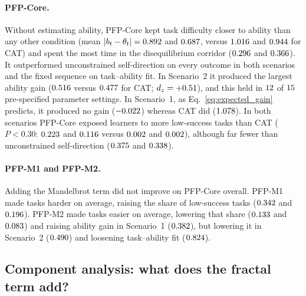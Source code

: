 \paragraph{PFP-Core.} Without estimating ability, PFP-Core kept task difficulty closer to ability than any other condition (mean $|b_t - \theta_t| = 0.892$ and $0.687$, versus $1.016$ and $0.944$ for CAT) and spent the most time in the disequilibrium corridor ($0.296$ and $0.366$). It outperformed unconstrained self-direction on every outcome in both scenarios and the fixed sequence on task--ability fit. In Scenario~2 it produced the largest ability gain ($0.516$ versus $0.477$ for CAT; $d_z = +0.51$), and this held in $12$ of $15$ pre-specified parameter settings. In Scenario~1, as Eq.~\eqref{eq:expected_gain} predicts, it produced no gain ($-0.022$) whereas CAT did ($1.078$). In both scenarios PFP-Core exposed learners to more low-success tasks than CAT ($P < 0.30$: $0.223$ and $0.116$ versus $0.002$ and $0.002$), although far fewer than unconstrained self-direction ($0.375$ and $0.338$).

\paragraph{PFP-M1 and PFP-M2.} Adding the Mandelbrot term did not improve on PFP-Core overall. PFP-M1 made tasks harder on average, raising the share of low-success tasks ($0.342$ and $0.196$). PFP-M2 made tasks easier on average, lowering that share ($0.133$ and $0.083$) and raising ability gain in Scenario~1 ($0.382$), but lowering it in Scenario~2 ($0.490$) and loosening task--ability fit ($0.824$).

\subsection{Component analysis: what does the fractal term add?}

\begin{table}[!t]
\centering
\caption{Component tests, paired differences with 95\% bootstrap intervals. Each row adds or replaces one component. The last column is the per-learner standard deviation of $|b_t - \theta_t|$ over tasks (lower = steadier fit); it was not recorded for PFP-Core.}
\label{tab:components}
\resizebox{\textwidth}{!}{}
\end{table}

